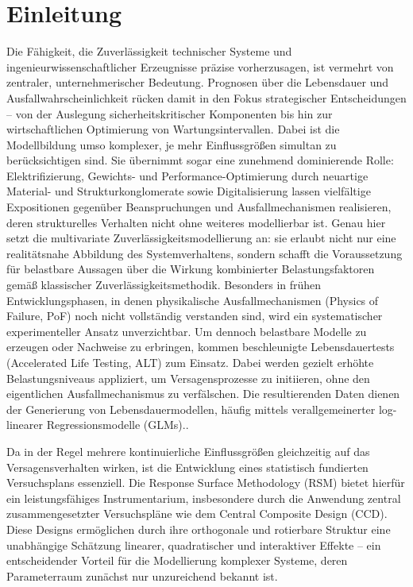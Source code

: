 
\chapter{Einleitung}
Die Fähigkeit, die Zuverlässigkeit technischer Systeme und ingenieurwissenschaftlicher Erzeugnisse präzise vorherzusagen, ist vermehrt von zentraler, unternehmerischer Bedeutung.
Prognosen über die Lebensdauer und Ausfallwahrscheinlichkeit rücken damit in den Fokus strategischer Entscheidungen – von der Auslegung sicherheitskritischer Komponenten bis hin zur wirtschaftlichen Optimierung von Wartungsintervallen. Dabei ist die Modellbildung umso komplexer, je mehr Einflussgrößen simultan zu berücksichtigen sind. Sie übernimmt sogar eine zunehmend dominierende Rolle: Elektrifizierung, Gewichts- und Performance-Optimierung durch neuartige Material- und Strukturkonglomerate sowie Digitalisierung lassen vielfältige Expositionen gegenüber Beanspruchungen und Ausfallmechanismen realisieren, deren strukturelles Verhalten nicht ohne weiteres modellierbar ist. Genau hier setzt die multivariate Zuverlässigkeitsmodellierung an: sie erlaubt nicht nur eine realitätsnahe Abbildung des Systemverhaltens, sondern schafft die Voraussetzung für belastbare Aussagen über die Wirkung kombinierter Belastungsfaktoren gemäß klassischer Zuverlässigkeitsmethodik. Besonders in frühen Entwicklungsphasen, in denen physikalische Ausfallmechanismen (Physics of Failure, PoF) noch nicht vollständig verstanden sind, wird ein systematischer experimenteller Ansatz unverzichtbar.  Um dennoch belastbare Modelle zu erzeugen oder Nachweise zu erbringen, kommen beschleunigte Lebensdauertests (Accelerated Life Testing, ALT) zum Einsatz. Dabei werden gezielt erhöhte Belastungsniveaus appliziert, um Versagensprozesse zu initiieren, ohne den eigentlichen Ausfallmechanismus zu verfälschen. Die resultierenden Daten dienen der Generierung von Lebensdauermodellen, häufig mittels verallgemeinerter log-linearer Regressionsmodelle (GLMs)..

Da in der Regel mehrere kontinuierliche Einflussgrößen gleichzeitig auf das Versagensverhalten wirken, ist die Entwicklung eines statistisch fundierten Versuchsplans essenziell. Die Response Surface Methodology (RSM) bietet hierfür ein leistungsfähiges Instrumentarium, insbesondere durch die Anwendung zentral zusammengesetzter Versuchspläne wie dem Central Composite Design (CCD). Diese Designs ermöglichen durch ihre orthogonale und rotierbare Struktur eine unabhängige Schätzung linearer, quadratischer und interaktiver Effekte – ein entscheidender Vorteil für die Modellierung komplexer Systeme, deren Parameterraum zunächst nur unzureichend bekannt ist.


